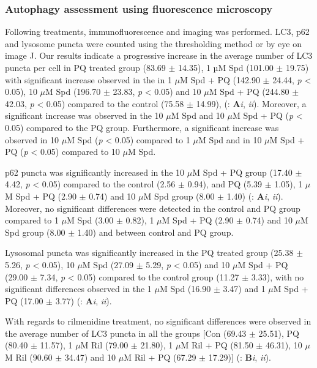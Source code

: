 \subsubsection{Autophagy assessment using fluorescence microscopy}
Following treatments, immunofluorescence and imaging was performed. LC3, p62 and lysosome puncta were counted using the thresholding method or by eye on image J. Our results indicate a progressive increase in the average number of LC3 puncta per cell in PQ treated group (83.69 $\pm$ 14.35), 1 µM Spd (101.00 $\pm$ 19.75) with significant increase observed in the in 1 $\mu$M Spd + PQ (142.90 $\pm$ 24.44, \textit{p} < 0.05), 10 $\mu$M Spd (196.70 $\pm$ 23.83, \textit{p} < 0.05) and 10 $\mu$M Spd + PQ (244.80 $\pm$ 42.03, \textit{p} < 0.05) compared to the control (75.58 $\pm$ 14.99), (: \textbf{A}\textit{i}, \textit{ii}). Moreover, a significant increase was observed in the 10 $\mu$M Spd and 10 $\mu$M Spd + PQ (\textit{p} < 0.05) compared to the PQ group. Furthermore, a significant increase was observed in 10 $\mu$M Spd (\textit{p} < 0.05) compared to 1 $\mu$M Spd  and in 10 $\mu$M Spd + PQ (\textit{p} < 0.05) compared to 10 $\mu$M Spd.


p62 puncta was significantly increased in the 10 $\mu$M Spd + PQ group (17.40 $\pm$ 4.42, \textit{p} < 0.05) compared to the control (2.56 $\pm$ 0.94), and PQ (5.39 $\pm$ 1.05), 1 $\mu$M Spd + PQ (2.90 $\pm$ 0.74) and 10 $\mu$M Spd group (8.00 $\pm$ 1.40) (: \textbf{A}\textit{i}, \textit{ii}). Moreover, no significant differences were detected in the control and PQ group compared to 1 $\mu$M Spd (3.00 $\pm$ 0.82), 1 $\mu$M Spd + PQ (2.90 $\pm$ 0.74) and 10 $\mu$M Spd group (8.00 $\pm$ 1.40) and between control and PQ group.

Lysosomal puncta was significantly increased in the PQ treated group (25.38 $\pm$ 5.26, \textit{p} < 0.05), 10 $\mu$M Spd (27.09 $\pm$ 5.29, \textit{p} < 0.05) and 10 $\mu$M Spd + PQ (29.00 $\pm$ 7.34, \textit{p} < 0.05) compared to the control group (11.27 $\pm$ 3.33), with no significant differences observed in the 1 $\mu$M Spd (16.90 $\pm$ 3.47) and 1 $\mu$M Spd + PQ (17.00 $\pm$ 3.77) (: \textbf{A}\textit{i}, \textit{ii}).

With regards to rilmenidine treatment, no significant differences were observed in the average number of LC3 puncta in all the groups [Con (69.43 $\pm$ 25.51), PQ (80.40 $\pm$ 11.57), 1 $\mu$M Ril (79.00 $\pm$ 21.80), 1 $\mu$M Ril + PQ (81.50 $\pm$ 46.31), 10 $\mu$M Ril (90.60 $\pm$ 34.47) and 10 $\mu$M Ril + PQ (67.29 $\pm$ 17.29)] (: \textbf{B}\textit{i}, \textit{ii}).

